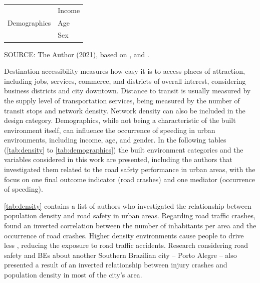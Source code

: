 \begin{table}[!hbtp]
\begin{tabular}{ll}
                                                    \hline
        \multirow{3}{*}{Demographics}              & Income                                   \\
                                                   & Age                                      \\
                                                   & Sex                                      \\ \hline
        \end{tabular}
    \label{tab:6d}
    \par \vspace{2mm} \footnotesize \raggedright
    SOURCE: The Author (2021), based on \textcite{Ewing2009}, \textcite{Ewing2010} and \textcite{Obelheiro2020}.
\end{table}

Destination accessibility measures how easy it is to access places of attraction, including jobs, services, commerce, and districts of overall interest, considering business districts and city downtown. Distance to transit is usually measured by the supply level of transportation services, being measured by the number of transit stops and network density. Network density can also be included in the design category. Demographics, while not being a characteristic of the built environment itself, can influence the occurrence of speeding in urban environments, including income, age, and gender. In the following tables (\autoref{tab:density} to \autoref{tab:demographics}) the built environment categories and the variables considered in this work are presented, including the authors that investigated them related to the road safety performance in urban areas, with the focus on one final outcome indicator (road crashes) and one mediator (occurrence of speeding).



\autoref{tab:density} contains a list of authors who investigated the relationship between population density and road safety in urban areas. Regarding road traffic crashes, \textcite{Dumbaugh2009, Obelheiro2020} found an inverted correlation between the number of inhabitants per area and the occurrence of road crashes. Higher density environments cause people to drive less \cite{Dumbaugh2009}, reducing the exposure to road traffic accidents. Research considering road safety and BEs about another Southern Brazilian city – Porto Alegre – also presented a result of an inverted relationship between injury crashes and population density in most of the city's area.


